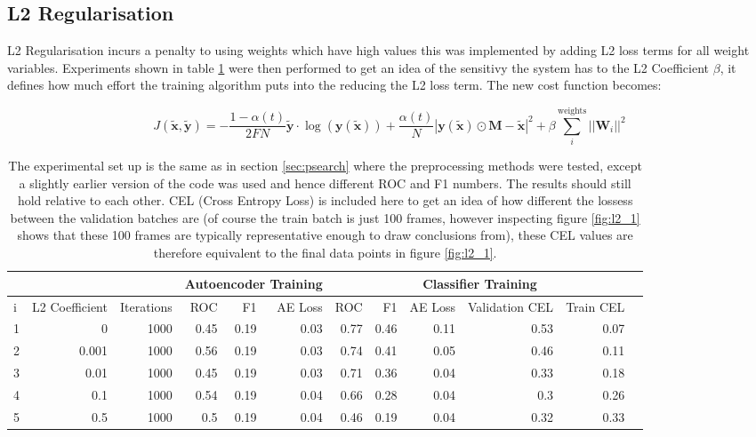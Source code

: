     \subsection{L2 Regularisation}
      L2 Regularisation incurs a penalty to using weights which have high values this was implemented by adding L2
      loss terms for all weight variables. Experiments shown in table
      \ref{tab:l2_1} were then performed to get an idea of the sensitivy the system has to
      the L2 Coefficient $\beta$, it defines how much effort the training algorithm
      puts into the reducing the L2 loss term. The new cost function becomes:

      \begin{equation}
          J(\tilde{\mathbf{x}},\tilde{\mathbf{y}}) = -\frac{1-\alpha(t)}{2FN}\tilde{\mathbf{y}}\cdot\log(\mathbf{y}(\tilde{\mathbf{x}}))
          + \frac{\alpha(t)}{N}\left |\mathbf{y}(\tilde{\mathbf{x}}) \odot \mathbf{M}-\tilde{\mathbf{x}}\right | ^2
          + \beta \sum_i^{\text{weights}}||\mathbf{W}_i||^2
      \end{equation}

      \begin{table}[!h] {\small \centering
      \begin{tabular}{lrrrrrrrrrrr}
        &&&   \multicolumn{3}{|c|}{Autoencoder Training} &  \multicolumn{5}{c|}{Classifier Training}  \\
      \hline
       i &   L2 Coefficient &   Iterations &   ROC&F1&AE Loss & ROC & F1 & AE Loss &   Validation CEL &   Train CEL \\
      \hline
       1 &     0     & 1000 &    0.45 &   0.19 &     0.03 &    0.77 &   0.46 &     0.11 &  0.53 &  0.07 \\
       2 &     0.001 & 1000 &    0.56 &   0.19 &     0.03 &    0.74 &   0.41 &     0.05 &  0.46 &  0.11 \\
       3 &     0.01  & 1000 &    0.45 &   0.19 &     0.03 &    0.71 &   0.36 &     0.04 &  0.33 &  0.18 \\
       4 &     0.1   & 1000 &    0.54 &   0.19 &     0.04 &    0.66 &   0.28 &     0.04 &  0.3  &  0.26 \\
       5 &     0.5   & 1000 &    0.5  &   0.19 &     0.04 &    0.46 &   0.19 &     0.04 &  0.32 &  0.33 \\
      \hline
    \end{tabular}
    \caption{The experimental set up is the same as in section \ref{sec:psearch} where the preprocessing methods
    were tested, except a slightly earlier version
    of the code was used and hence different ROC and F1 numbers.
    The results should still hold relative to each other.
    CEL (Cross Entropy Loss) is included here to get an idea of how different
    the lossess between the validation batches are (of course the
    train batch is just 100 frames, however inspecting figure \ref{fig:l2_1} shows that
    these 100 frames are typically representative enough to draw conclusions from), these
    CEL values are therefore equivalent to the final data points in figure \ref{fig:l2_1}. } \label{tab:l2_1}
    }
    \end{table}



